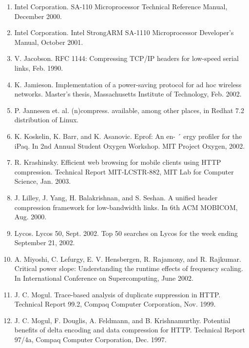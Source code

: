 \documentclass{article}
\begin{document}
\begin{enumerate}
	\item Intel Corporation. SA-110 Microprocessor Technical Reference Manual, December 2000.


	\item Intel Corporation. Intel StrongARM SA-1110 Microprocessor Developer’s Manual, October 2001.

	\item V. Jacobson. RFC 1144: Compressing TCP/IP headers
	for low-speed serial links, Feb. 1990.

	\item K. Jamieson. Implementation of a power-saving protocol for ad hoc wireless networks. Master’s thesis, Massachusetts Institute of Technology, Feb. 2002.

	\item P. Jannesen et. al. (n)compress. available, among other
	places, in Redhat 7.2 distribution of Linux.

	\item K. Koskelin, K. Barr, and K. Asanovic. Eprof: An en- ´
	ergy profiler for the iPaq. In 2nd Annual Student Oxygen
	Workshop. MIT Project Oxygen, 2002.

	\item R. Krashinsky. Efficient web browsing for mobile clients
	using HTTP compression. Technical Report MIT-LCSTR-882, MIT Lab for Computer Science, Jan. 2003.

	\item J. Lilley, J. Yang, H. Balakrishnan, and S. Seshan. A unified header compression framework for low-bandwidth
	links. In 6th ACM MOBICOM, Aug. 2000.

	\item Lycos. Lycos 50, Sept. 2002. Top 50 searches on Lycos
	for the week ending September 21, 2002.

	\item A. Miyoshi, C. Lefurgy, E. V. Hensbergen, R. Rajamony,
	and R. Rajkumar. Critical power slope: Understanding
	the runtime effects of frequency scaling. In International
	Conference on Supercomputing, June 2002.

	\item J. C. Mogul. Trace-based analysis of duplicate suppression in HTTP. Technical Report 99.2, Compaq Computer
	Corporation, Nov. 1999.

	\item J. C. Mogul, F. Douglis, A. Feldmann, and B. Krishnamurthy. Potential benefits of delta encoding and data
	compression for HTTP. Technical Report 97/4a, Compaq Computer Corporation, Dec. 1997.


\end{enumerate}
\end{document}
